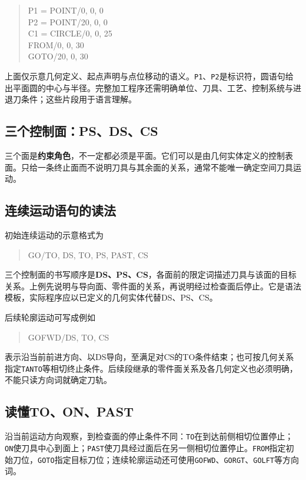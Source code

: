 \begin{quote}\ttfamily
P1 = POINT/0, 0, 0\\
P2 = POINT/20, 0, 0\\
C1 = CIRCLE/0, 0, 25\\
FROM/0, 0, 30\\
GOTO/20, 0, 30
\end{quote}
上面仅示意几何定义、起点声明与点位移动的语义。\texttt{P1}、\texttt{P2}是标识符，圆语句给出平面圆的中心与半径。完整加工程序还需明确单位、刀具、工艺、控制系统与进退刀条件；这些片段用于语言理解。

\subsection{三个控制面：PS、DS、CS}

三个面是\textbf{约束角色}，不一定都必须是平面。它们可以是由几何实体定义的控制表面。只给一条终止面而不说明刀具与其余面的关系，通常不能唯一确定空间刀具运动。

\subsection{连续运动语句的读法}
初始连续运动的示意格式为
\begin{quote}\ttfamily
GO/TO, DS, TO, PS, PAST, CS
\end{quote}
三个控制面的书写顺序是\textbf{DS、PS、CS}，各面前的限定词描述刀具与该面的目标关系。上例先说明与导向面、零件面的关系，再说明经过检查面后停止。它是语法模板，实际程序应以已定义的几何实体代替DS、PS、CS。

后续轮廓运动可写成例如
\begin{quote}\ttfamily
GOFWD/DS, TO, CS
\end{quote}
表示沿当前前进方向、以DS导向，至满足对CS的TO条件结束；也可按几何关系指定\texttt{TANTO}等相切终止条件。后续段继承的零件面关系及各几何定义也必须明确，不能只读方向词就确定刀轨。

\subsection{读懂TO、ON、PAST}
沿当前运动方向观察，到检查面的停止条件不同：\texttt{TO}在到达前侧相切位置停止；\texttt{ON}使刀具中心到面上；\texttt{PAST}使刀具经过面后在另一侧相切位置停止。\texttt{FROM}指定初始刀位，\texttt{GOTO}指定目标刀位；连续轮廓运动还可使用\texttt{GOFWD}、\texttt{GORGT}、\texttt{GOLFT}等方向词。

